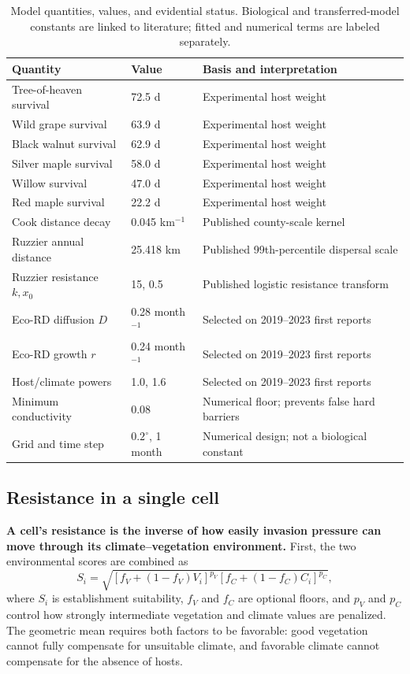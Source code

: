 \documentclass{article}
\begin{document}
\begin{table}[htbp]
\centering
\caption{Model quantities, values, and evidential status. Biological and transferred-model constants are linked to literature; fitted and numerical terms are labeled separately.}
\label{tab:parameters}
\small
\begin{tabularx}{\textwidth}{@{}l l X@{}}
\toprule
Quantity & Value & Basis and interpretation \\
\midrule
Tree-of-heaven survival & 72.5 d & Experimental host weight \cite{nixon2020} \\
Wild grape survival & 63.9 d & Experimental host weight \cite{nixon2020} \\
Black walnut survival & 62.9 d & Experimental host weight \cite{nixon2020} \\
Silver maple survival & 58.0 d & Experimental host weight \cite{nixon2020} \\
Willow survival & 47.0 d & Experimental host weight \cite{nixon2020} \\
Red maple survival & 22.2 d & Experimental host weight \cite{nixon2020} \\
Cook distance decay & 0.045 km$^{-1}$ & Published county-scale kernel \cite{cook2021} \\
Ruzzier annual distance & 25.418 km & Published 99th-percentile dispersal scale \cite{ruzzier2025} \\
Ruzzier resistance $k,x_0$ & 15, 0.5 & Published logistic resistance transform \cite{ruzzier2025} \\
Eco-RD diffusion $D$ & 0.28 month$^{-1}$ & Selected on 2019--2023 first reports \\
Eco-RD growth $r$ & 0.24 month$^{-1}$ & Selected on 2019--2023 first reports \\
Host/climate powers & 1.0, 1.6 & Selected on 2019--2023 first reports \\
Minimum conductivity & 0.08 & Numerical floor; prevents false hard barriers \\
Grid and time step & $0.2^\circ$, 1 month & Numerical design; not a biological constant \\
\bottomrule
\end{tabularx}
\end{table}

\subsection{Resistance in a single cell}

\textbf{A cell's resistance is the inverse of how easily invasion pressure can move through its climate--vegetation environment.} First, the two environmental scores are combined as
\begin{equation}
S_i=\sqrt{
  [f_V+(1-f_V)V_i]^{p_V}
  [f_C+(1-f_C)C_i]^{p_C}},
\end{equation}
where $S_i$ is establishment suitability, $f_V$ and $f_C$ are optional floors, and $p_V$ and $p_C$ control how strongly intermediate vegetation and climate values are penalized. The geometric mean requires both factors to be favorable: good vegetation cannot fully compensate for unsuitable climate, and favorable climate cannot compensate for the absence of hosts.
\end{document}
